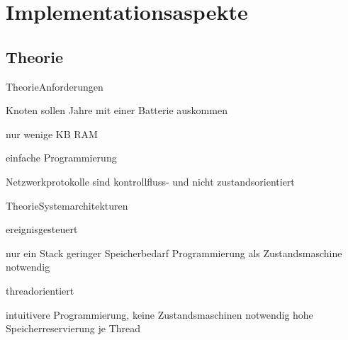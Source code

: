 \section{Implementationsaspekte}

%

\subsection{Theorie}
\begin{frame}{Theorie}{Anforderungen}
	\begin{description}[Programmierung]
	\item[Strom]
		Knoten sollen Jahre mit einer Batterie auskommen
	\item[Speicher]
		nur wenige KB RAM
	\item[Programmierung]
		einfache Programmierung

		Netzwerkprotokolle sind kontrollfluss- und nicht zustandsorientiert
	\end{description}
\end{frame}

\begin{frame}{Theorie}{Systemarchitekturen}
	\begin{block}{ereignisgesteuert}
		\begin{proconlist}
		\pro	nur ein Stack \conclusion geringer Speicherbedarf
		\contra	Programmierung als Zustandsmaschine notwendig
		\end{proconlist}
	\end{block}

	\begin{block}{threadorientiert}
		\begin{proconlist}
		\pro	intuitivere Programmierung, keine Zustandsmaschinen
			notwendig
		\contra	hohe Speicherreservierung je Thread
		\end{proconlist}
	\end{block}
\end{frame}

